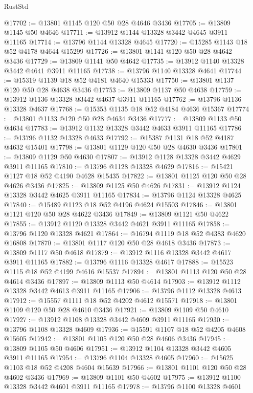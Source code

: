 \begin{lexlean}{RustStd}
\begin{coremodule}
@17702 := @13801 @1145 @120 @50 @28 @4646 @3436
@17705 := @13809 @1145 @50 @4646
@17711 := @13912 @1144 @13328 @3442 @4645 @3911 @11165
@17714 := @13796 @1144 @13328 @4645
@17720 := @15285 @1143 @18 @52 @4178 @4644 @15299
@17726 := @13801 @1141 @120 @50 @28 @4642 @3436
@17729 := @13809 @1141 @50 @4642
@17735 := @13912 @1140 @13328 @3442 @4641 @3911 @11165
@17738 := @13796 @1140 @13328 @4641
@17744 := @15319 @1139 @18 @52 @4181 @4640 @15333
@17750 := @13801 @1137 @120 @50 @28 @4638 @3436
@17753 := @13809 @1137 @50 @4638
@17759 := @13912 @1136 @13328 @3442 @4637 @3911 @11165
@17762 := @13796 @1136 @13328 @4637
@17768 := @15353 @1135 @18 @52 @4184 @4636 @15367
@17774 := @13801 @1133 @120 @50 @28 @4634 @3436
@17777 := @13809 @1133 @50 @4634
@17783 := @13912 @1132 @13328 @3442 @4633 @3911 @11165
@17786 := @13796 @1132 @13328 @4633
@17792 := @15387 @1131 @18 @52 @4187 @4632 @15401
@17798 := @13801 @1129 @120 @50 @28 @4630 @3436
@17801 := @13809 @1129 @50 @4630
@17807 := @13912 @1128 @13328 @3442 @4629 @3911 @11165
@17810 := @13796 @1128 @13328 @4629
@17816 := @15421 @1127 @18 @52 @4190 @4628 @15435
@17822 := @13801 @1125 @120 @50 @28 @4626 @3436
@17825 := @13809 @1125 @50 @4626
@17831 := @13912 @1124 @13328 @3442 @4625 @3911 @11165
@17834 := @13796 @1124 @13328 @4625
@17840 := @15489 @1123 @18 @52 @4196 @4624 @15503
@17846 := @13801 @1121 @120 @50 @28 @4622 @3436
@17849 := @13809 @1121 @50 @4622
@17855 := @13912 @1120 @13328 @3442 @4621 @3911 @11165
@17858 := @13796 @1120 @13328 @4621
@17864 := @16794 @1119 @18 @52 @4383 @4620 @16808
@17870 := @13801 @1117 @120 @50 @28 @4618 @3436
@17873 := @13809 @1117 @50 @4618
@17879 := @13912 @1116 @13328 @3442 @4617 @3911 @11165
@17882 := @13796 @1116 @13328 @4617
@17888 := @15523 @1115 @18 @52 @4199 @4616 @15537
@17894 := @13801 @1113 @120 @50 @28 @4614 @3436
@17897 := @13809 @1113 @50 @4614
@17903 := @13912 @1112 @13328 @3442 @4613 @3911 @11165
@17906 := @13796 @1112 @13328 @4613
@17912 := @15557 @1111 @18 @52 @4202 @4612 @15571
@17918 := @13801 @1109 @120 @50 @28 @4610 @3436
@17921 := @13809 @1109 @50 @4610
@17927 := @13912 @1108 @13328 @3442 @4609 @3911 @11165
@17930 := @13796 @1108 @13328 @4609
@17936 := @15591 @1107 @18 @52 @4205 @4608 @15605
@17942 := @13801 @1105 @120 @50 @28 @4606 @3436
@17945 := @13809 @1105 @50 @4606
@17951 := @13912 @1104 @13328 @3442 @4605 @3911 @11165
@17954 := @13796 @1104 @13328 @4605
@17960 := @15625 @1103 @18 @52 @4208 @4604 @15639
@17966 := @13801 @1101 @120 @50 @28 @4602 @3436
@17969 := @13809 @1101 @50 @4602
@17975 := @13912 @1100 @13328 @3442 @4601 @3911 @11165
@17978 := @13796 @1100 @13328 @4601

\end{coremodule}
\end{lexlean}
